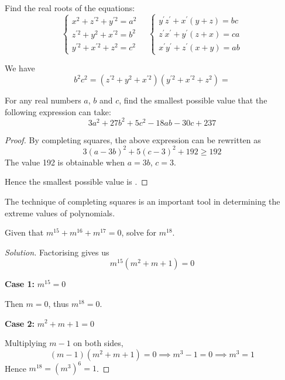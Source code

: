 \begin{prbm}[TRIPOS 1878]
Find the real roots of the equations:
\[ \begin{cases}
    x^2 + z^{\prime2} + y^{\prime2} = a^2 \\
    z^{\prime2} + y^2 + x^{\prime2} = b^2 \\
    y^{\prime2} + x^{\prime2} + z^2 = c^2
\end{cases} \quad
\begin{cases}
    y^\prime z^\prime + x^\prime(y+z) = bc \\
    z^\prime x^\prime + y^\prime(z+x) = ca \\
    x^\prime y^\prime + z^\prime(x+y) = ab
\end{cases}
\]
\end{prbm}
\begin{solution}
We have
\[ b^2c^2 = (z^{\prime2} + y^2 + x^{\prime2})(y^{\prime2} + x^{\prime2} + z^2) =  \]
\end{solution}
\pagebreak

\begin{prbm}[SSSMO 2000]
For any real numbers $a$, $b$ and $c$, find the smallest possible value that the following expression can take:
\[ 3a^2 + 27b^2 + 5c^2 - 18ab - 30c + 237 \]
\end{prbm}

\begin{proof}
By completing squares, the above expression can be rewritten as
\[ 3(a-3b)^2+5(c-3)^2+192 \ge 192 \]
The value 192 is obtainable when $a=3b$, $c=3$. 

Hence the smallest possible value is .
\end{proof}

\begin{remark}
The technique of completing squares is an important tool in determining the extreme values of polynomials.
\end{remark}
\pagebreak

\begin{prbm}[GERMANY]
Given that $m^{15}+m^{16}+m^{17}=0$, solve for $m^{18}$.
\end{prbm}

\begin{proof}[Solution]
Factorising gives us 
\[ m^{15}(m^2+m+1)=0 \]

\textbf{Case 1:} $m^{15}=0$

Then $m=0$, thus $m^{18}=0$.

\textbf{Case 2:} $m^2+m+1=0$

Multiplying $m-1$ on both sides, 
\[ (m-1)(m^2+m+1)=0 \implies m^3-1=0 \implies m^3=1 \]
Hence $m^{18}=(m^3)^6=\boxed{1}$.
\end{proof}
\pagebreak


